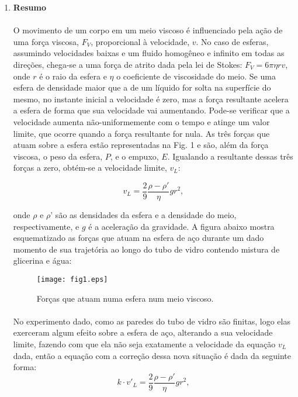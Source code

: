 \documentclass[a4paper, 11pt]{article}
\begin{document}

	\begin{enumerate}
	\item \textbf{Resumo}
\paragraph{}

	O movimento de um corpo em um meio viscoso é influenciado pela ação de uma força viscosa, $F_V$, proporcional à velocidade, $v$. No caso de esferas, assumindo velocidades baixas e um fluido homogêneo e infinito em todas as direções, chega-se a uma força de atrito dada pela lei de Stokes: $F_V = 6 \pi \eta rv$, onde $r$ é o raio da esfera e $\eta$ o coeficiente de viscosidade do meio. Se uma esfera de densidade maior que a de um líquido for solta na superfície do mesmo, no instante inicial a velocidade é zero, mas a força resultante acelera a esfera de forma que sua velocidade vai aumentando. Pode-se verificar que a velocidade aumenta não-uniformemente com o tempo e atinge um valor limite, que ocorre quando a força resultante for nula. As três forças que atuam sobre a esfera estão representadas na Fig. 1 e são, além da força viscosa, o peso da esfera, $P$, e o empuxo, $E$. Igualando a resultante dessas três forças a zero, obtém-se a velocidade limite, $v_L$:

$$ v_L = \dfrac{2}{9} \dfrac{\rho - \rho'}{\eta} g r^2 , $$

onde $\rho$ e $\rho’$ são as densidades da esfera e a densidade do meio, respectivamente, e $g$ é a aceleração da gravidade. A figura abaixo mostra esquematizado as forças que atuam na esfera de aço durante um dado momento de sua trajetória ao longo do tubo de vidro contendo mistura de glicerina e água:

		\begin{figure}[h]
		\centering
		\texttt{[image: fig1.eps]}
		\caption{Forças que atuam numa esfera num meio viscoso.}
		\end{figure}

\paragraph{}
No experimento dado, como as paredes do tubo de vidro são finitas, logo elas exerceram algum efeito sobre a esfera de aço, alterando a sua velocidade limite, fazendo com que ela não seja exatamente a velocidade da equação $v_L$ dada, então a equação com a correção dessa nova situação é dada da seguinte forma:
$$k \cdot v'_L = \dfrac{2}{9} \dfrac{\rho - \rho'}{\eta} g r^2 ,$$


\end{enumerate}
\end{document}

